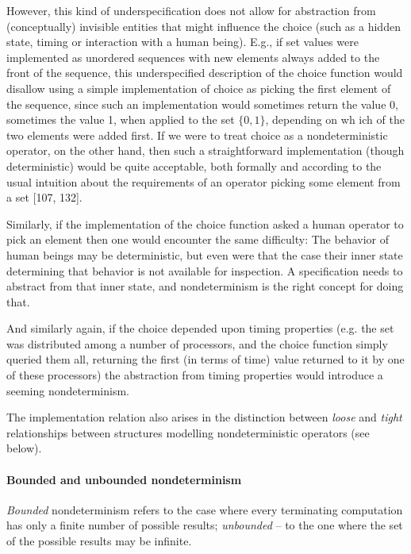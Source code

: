 \documentclass[10pt]{article}
\begin{document}
 However, this kind of underspecification does 
not allow for abstraction from (conceptually) invisible entities that 
might influence the choice (such as a hidden state, timing or 
interaction with a human being). E.g., if set values were implemented 
as un\-or\-dered sequences with new elements always added to the 
front of the sequence, this underspecified description of the choice function would disallow using a 
simple imple\-men\-tation of choice as picking the first element 
of the sequence, since 
such an implementation would sometimes return the value 0, sometimes 
the value 1, when applied to the set $\{0,1\}$, depending on wh
ich of the two elements were added first. If we were to treat choice 
as a nondeterministic operator, on the other hand, then such a 
straightforward implementation (though deterministic) would be quite 
acceptable, both formally and according to the usual intuition 
about the requirements of an operator picking some element 
from a set [107, 132].

 Similarly, if the implementation of the choice 
function asked a human operator to pick an element then one would 
encounter the same difficulty: The behavior of human
 beings may be deterministic, but even were that the case their inner 
state determining that behavior is not available for inspection. A 
specification needs to abstract from that inner state, and 
nondeterminism is the right concept for doing that.

 And similarly again, if the choice depended 
upon timing properties (e.g. the set was distributed among a number of processors, and the choice function simply 
queried them all, returning the first (in terms of time) value 
returned to it by one of these processors) the abstraction from timing properties would introduce a seeming 
nondeterminism.

 The implementation relation also arises in the 
distinction between {\em loose} and {\em tight} relationships between 
structures modelling nondeterministic operators (see below).

\paragraph*{Bounded and unbounded nondeterminism}
 {\em Bounded} nondeterminism refers 
to the case where every terminating computation has only a finite 
number of possible results; {\em unbounded}  -- to the one where 
the set of the possible results may be infinite. 
\end{document}
